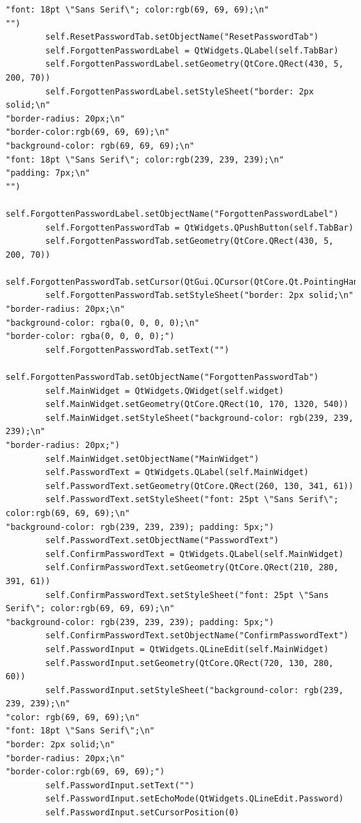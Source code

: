 \documentclass[12pt]{article}
\begin{document}
\begin{lstlisting}
"font: 18pt \"Sans Serif\"; color:rgb(69, 69, 69);\n"
"")
        self.ResetPasswordTab.setObjectName("ResetPasswordTab")
        self.ForgottenPasswordLabel = QtWidgets.QLabel(self.TabBar)
        self.ForgottenPasswordLabel.setGeometry(QtCore.QRect(430, 5, 200, 70))
        self.ForgottenPasswordLabel.setStyleSheet("border: 2px solid;\n"
"border-radius: 20px;\n"
"border-color:rgb(69, 69, 69);\n"
"background-color: rgb(69, 69, 69);\n"
"font: 18pt \"Sans Serif\"; color:rgb(239, 239, 239);\n"
"padding: 7px;\n"
"")
        self.ForgottenPasswordLabel.setObjectName("ForgottenPasswordLabel")
        self.ForgottenPasswordTab = QtWidgets.QPushButton(self.TabBar)
        self.ForgottenPasswordTab.setGeometry(QtCore.QRect(430, 5, 200, 70))
        self.ForgottenPasswordTab.setCursor(QtGui.QCursor(QtCore.Qt.PointingHandCursor))
        self.ForgottenPasswordTab.setStyleSheet("border: 2px solid;\n"
"border-radius: 20px;\n"
"background-color: rgba(0, 0, 0, 0);\n"
"border-color: rgba(0, 0, 0, 0);")
        self.ForgottenPasswordTab.setText("")
        self.ForgottenPasswordTab.setObjectName("ForgottenPasswordTab")
        self.MainWidget = QtWidgets.QWidget(self.widget)
        self.MainWidget.setGeometry(QtCore.QRect(10, 170, 1320, 540))
        self.MainWidget.setStyleSheet("background-color: rgb(239, 239, 239);\n"
"border-radius: 20px;")
        self.MainWidget.setObjectName("MainWidget")
        self.PasswordText = QtWidgets.QLabel(self.MainWidget)
        self.PasswordText.setGeometry(QtCore.QRect(260, 130, 341, 61))
        self.PasswordText.setStyleSheet("font: 25pt \"Sans Serif\"; color:rgb(69, 69, 69);\n"
"background-color: rgb(239, 239, 239); padding: 5px;")
        self.PasswordText.setObjectName("PasswordText")
        self.ConfirmPasswordText = QtWidgets.QLabel(self.MainWidget)
        self.ConfirmPasswordText.setGeometry(QtCore.QRect(210, 280, 391, 61))
        self.ConfirmPasswordText.setStyleSheet("font: 25pt \"Sans Serif\"; color:rgb(69, 69, 69);\n"
"background-color: rgb(239, 239, 239); padding: 5px;")
        self.ConfirmPasswordText.setObjectName("ConfirmPasswordText")
        self.PasswordInput = QtWidgets.QLineEdit(self.MainWidget)
        self.PasswordInput.setGeometry(QtCore.QRect(720, 130, 280, 60))
        self.PasswordInput.setStyleSheet("background-color: rgb(239, 239, 239);\n"
"color: rgb(69, 69, 69);\n"
"font: 18pt \"Sans Serif\";\n"
"border: 2px solid;\n"
"border-radius: 20px;\n"
"border-color:rgb(69, 69, 69);")
        self.PasswordInput.setText("")
        self.PasswordInput.setEchoMode(QtWidgets.QLineEdit.Password)
        self.PasswordInput.setCursorPosition(0)

\end{lstlisting}
\end{document}

